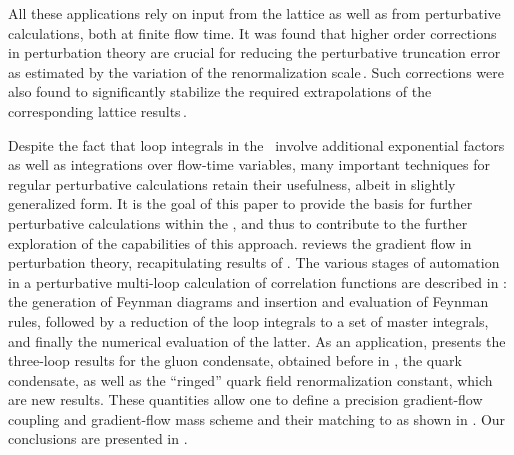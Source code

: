 All these applications rely on input from the lattice as well as from
perturbative calculations, both at finite flow time. It was found that
higher order corrections in perturbation theory are crucial for reducing
the perturbative truncation error as estimated by the variation of the
renormalization scale\,\cite{Harlander:2016vzb,Harlander:2018zpi}. Such
corrections were also found to significantly stabilize the required
extrapolations of the corresponding lattice
results\,\cite{Iritani:2018idk}.

Despite the fact that loop integrals in the \gff\ involve additional
exponential factors as well as integrations over flow-time variables,
many important techniques for regular perturbative calculations retain
their usefulness, albeit in slightly generalized form. It is the goal of
this paper to provide the basis for further perturbative calculations
within the \gff, and thus to contribute to the further exploration of
the capabilities of this approach.  reviews the \qcd{}
gradient flow in perturbation theory, recapitulating results of
. The various
stages of automation in a perturbative multi-loop calculation of
correlation functions are described in : the
generation of Feynman diagrams and insertion and evaluation of Feynman
rules, followed by a reduction of the loop integrals to a set of master
integrals, and finally the numerical evaluation of the latter. As an
application,  presents the three-loop results for
the gluon condensate, obtained before in , the
quark condensate, as well as the ``ringed'' quark field renormalization
constant, which are new results.  These quantities allow one to define a
precision gradient-flow coupling and gradient-flow mass scheme and their
matching to \msbar{} as shown in . Our
conclusions are presented in .
